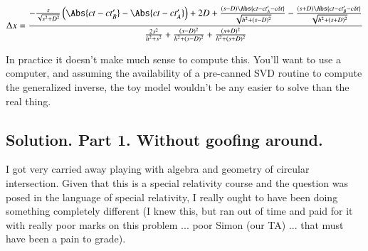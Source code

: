 \begin{equation}\label{eqn:relativisticElectrodynamicsA1:400}
\Delta x =
\frac{
   -\frac{s}{\sqrt{s^2 + D^2}} \left( \Abs{ ct - c t_B' } - \Abs{ c t - c t_A'} \right) +2 D
   + \frac{(s - D)\Abs{c t - c t_A' - c \delta t} }{ \sqrt{ h^2 + (s - D)^2 } } 
   - \frac{(s + D)\Abs{c t - c t_B' - c \delta t} }{ \sqrt{ h^2 + (s + D)^2 } } }
{
   \frac{2 s^2}{h^2 + s^2}
   +\frac{(s - D)^2}{h^2 + (s -D)^2}
   +\frac{(s + D)^2}{h^2 + (s +D)^2}
}
\end{equation}

In practice it doesn't make much sense to compute this.  You'll want to use a computer, and assuming the availability of a pre-canned SVD routine to compute the generalized inverse, the toy model wouldn't be any easier to solve than the real thing.



%
%
%

\subsection{Solution. Part 1.  Without goofing around.}

I got very carried away playing with algebra and geometry of circular intersection.  Given that this is a special relativity course and the question was posed in the language of special relativity, I really ought to have been doing something completely different (I knew this, but ran out of time and paid for it with really poor marks on this problem ... poor Simon (our TA) ... that must have been a pain to grade).

